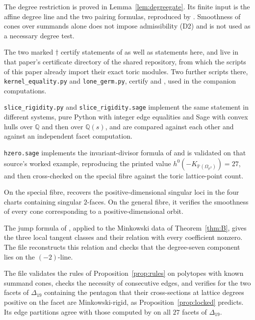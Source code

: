 \documentclass[11pt]{amsart}
\theoremstyle{definition}
\theoremstyle{remark}
\theoremstyle{plain}
\newcommand{\QQ}{\mathbb{Q}}
\newcommand{\PP}{\mathbb{P}}
\begin{document}
The degree restriction is proved in Lemma~\ref{lem:degreegate}.
Its finite input is the affine degree line and the two pairing
formulas, reproduced by .  Smoothness of
cones over summands alone does not impose admissibility (D2) and is
not used as a necessary degree test.

The two marked $\dagger$ certify statements of \cite{PaperIV} as well as
statements here, and live in that paper's certificate directory of the shared
repository, from which the scripts of this paper already import their exact
toric modules.  Two further scripts there,
\texttt{kernel\_equality.py} and \texttt{lone\_germ.py}, certify
\cite[Prop.~8.3]{PaperIV} and \cite[\S9.2]{PaperIV}, used in the companion computations.

\texttt{slice\_rigidity.py} and \texttt{slice\_rigidity.sage} implement the same
statement in different systems, pure Python with integer edge equalities and
Sage with convex hulls over $\QQ$ and then over $\QQ(s)$, and are
compared against each other and against an independent facet computation.

\texttt{hzero.sage} implements the invariant-divisor formula of
\cite{PS11} and is validated on that source's worked example,
reproducing the printed value $h^0(-K_{\PP(\Omega_{\PP^2})}) = 27$, and then
cross-checked on the special fibre against the toric lattice-point count.

On the special fibre,  recovers the
positive-dimensional singular loci in the four charts containing
singular $2$-faces.  On the general fibre, it verifies the smoothness
of every cone corresponding to a positive-dimensional orbit.

The jump formula of \cite[Prop.~8.2]{PaperIV}, applied to the
Minkowski data of Theorem~\ref{thm:B}, gives the three local tangent
classes and their relation with every coefficient nonzero.
The file  reconstructs this relation and
checks that the degree-seven component lies on the $(-2)$-line.

The file  validates the rules of
Proposition~\ref{prop:rules} on polytopes with known summand cones, checks the
necessity of consecutive edges, and verifies for the two facets of
$\Delta_{19}$ containing the pentagon that their cross-sections at lattice
degrees positive on the facet are Minkowski-rigid, as
Proposition~\ref{prop:locked} predicts.  Its edge partitions agree with
those computed by  on all $27$ facets
of $\Delta_{19}$.
\end{document}
